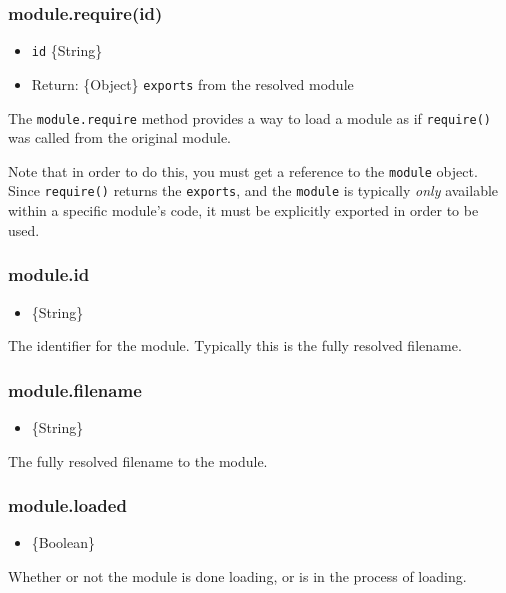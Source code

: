 \subsubsection{module.require(id)}

\begin{itemize}
\item
  \texttt{id} \{String\}
\item
  Return: \{Object\} \texttt{exports} from the resolved module
\end{itemize}

The \texttt{module.require} method provides a way to load a module as if
\texttt{require()} was called from the original module.

Note that in order to do this, you must get a reference to the
\texttt{module} object. Since \texttt{require()} returns the
\texttt{exports}, and the \texttt{module} is typically \emph{only}
available within a specific module's code, it must be explicitly
exported in order to be used.

\subsubsection{module.id}

\begin{itemize}
\item
  \{String\}
\end{itemize}

The identifier for the module. Typically this is the fully resolved
filename.

\subsubsection{module.filename}

\begin{itemize}
\item
  \{String\}
\end{itemize}

The fully resolved filename to the module.

\subsubsection{module.loaded}

\begin{itemize}
\item
  \{Boolean\}
\end{itemize}

Whether or not the module is done loading, or is in the process of
loading.

